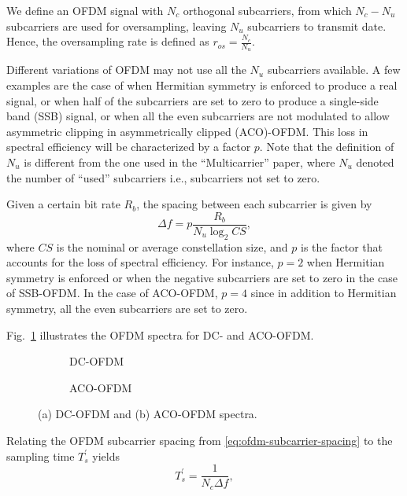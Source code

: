 \documentclass[a4paper]{article}
\begin{document}
We define an OFDM signal with $N_c$ orthogonal subcarriers, from which $N_c - N_u$ subcarriers are used for oversampling, leaving $N_u$ subcarriers to transmit date. Hence, the oversampling rate is defined as $r_{os} = \frac{N_c}{N_u}$. 

Different variations of OFDM may not use all the $N_u$ subcarriers available. A few examples are the case of when Hermitian symmetry is enforced to produce a real signal, or when half of the subcarriers are set to zero to produce a single-side band (SSB) signal, or when all the even subcarriers are not modulated to allow asymmetric clipping in asymmetrically clipped (ACO)-OFDM. This loss in spectral efficiency will be characterized by a factor $p$. Note that the definition of $N_u$ is different from the one used in the ``Multicarrier'' paper, where $N_u$ denoted the number of ``used'' subcarriers i.e., subcarriers not set to zero. 

Given a certain bit rate $R_b$, the spacing between each subcarrier is given by
\begin{equation} \label{eq:ofdm-subcarrier-spacing}
\Delta f = p\frac{R_b}{N_u\log_2 CS},
\end{equation}
where $CS$ is the nominal or average constellation size, and $p$ is the factor that accounts for the loss of spectral efficiency. For instance, $p = 2$ when Hermitian symmetry is enforced or when the negative subcarriers are set to zero in the case of SSB-OFDM. In the case of ACO-OFDM, $p = 4$ since in addition to Hermitian symmetry, all the even subcarriers are set to zero. 

Fig.~\ref{fig:ofdm-spectra} illustrates the OFDM spectra for DC- and ACO-OFDM.

\FloatBarrier
\begin{figure}[h!]
	\centering
	\begin{subfigure}[h!]{\textwidth}
		\centering
		\resizebox{\linewidth}{!}{}
		\caption{DC-OFDM}
	\end{subfigure}%
	
	\begin{subfigure}[h!]{\textwidth}
		\centering
		\resizebox{\linewidth}{!}{}
		\caption{ACO-OFDM}
	\end{subfigure}
	\caption{(a) DC-OFDM and (b) ACO-OFDM spectra.} \label{fig:ofdm-spectra}
\end{figure}
\FloatBarrier

Relating the OFDM subcarrier spacing from \eqref{eq:ofdm-subcarrier-spacing} to the sampling time $T_s^{\prime}$ yields
\begin{equation}
T_s^{\prime} = \frac{1}{N_c\Delta f},
\end{equation}
\end{document}
